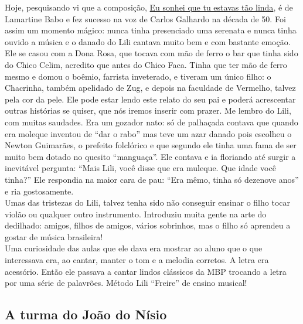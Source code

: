 \documentclass[12pt,brazil,]{book}
\begin{document}
Hoje, pesquisando vi que a composição,
\href{https://www.youtube.com/watch?v=5hHoRXzd8PI}{Eu sonhei que tu
estavas tão linda}, é de Lamartine Babo e fez sucesso na voz de Carlos
Galhardo na década de 50. Foi assim um momento mágico: nunca tinha
presenciado uma serenata e nunca tinha ouvido a música e o danado do
Lili cantava muito bem e com bastante emoção. Ele se casou com a Dona
Rosa, que tocava com mão de ferro o bar que tinha sido do Chico Celim,
acredito que antes do Chico Faca. Tinha que ter mão de ferro mesmo e
domou o boêmio, farrista inveterado, e tiveram um único filho: o
Chacrinha, também apelidado de Zug, e depois na faculdade de Vermelho,
talvez pela cor da pele. Ele pode estar lendo este relato do seu pai e
poderá acrescentar outras histórias se quiser, que nós iremos inserir
com prazer. Me lembro do Lili, com muitas saudades. Era um gozador nato:
só de palhaçada contava que quando era moleque inventou de ``dar o
rabo'' mas teve um azar danado pois escolheu o Newton Guimarães, o
prefeito folclórico e que segundo ele tinha uma fama de ser muito bem
dotado no quesito ``manguaça''. Ele contava e ia floriando até surgir a
inevitável pergunta: ``Mais Lili, você disse que era muleque. Que idade
você tinha?'' Ele respondia na maior cara de pau: ``Era mêmo, tinha só
dezenove anos'' e ria gostosamente.\\
Umas das tristezas do Lili, talvez tenha sido não conseguir ensinar o
filho tocar violão ou qualquer outro instrumento. Introduziu muita gente
na arte do dedilhado: amigos, filhos de amigos, vários sobrinhos, mas o
filho só aprendeu a gostar de música brasileira!\\
Uma curiosidade das aulas que ele dava era mostrar ao aluno que o que
interessava era, ao cantar, manter o tom e a melodia corretos. A letra
era acessório. Então ele passava a cantar lindos clássicos da MBP
trocando a letra por uma série de palavrões. Método Lili ``Freire'' de
ensino musical!

\subsection{A turma do João do
Nísio}\label{a-turma-do-jouxe3o-do-nuxedsio}
\end{document}
